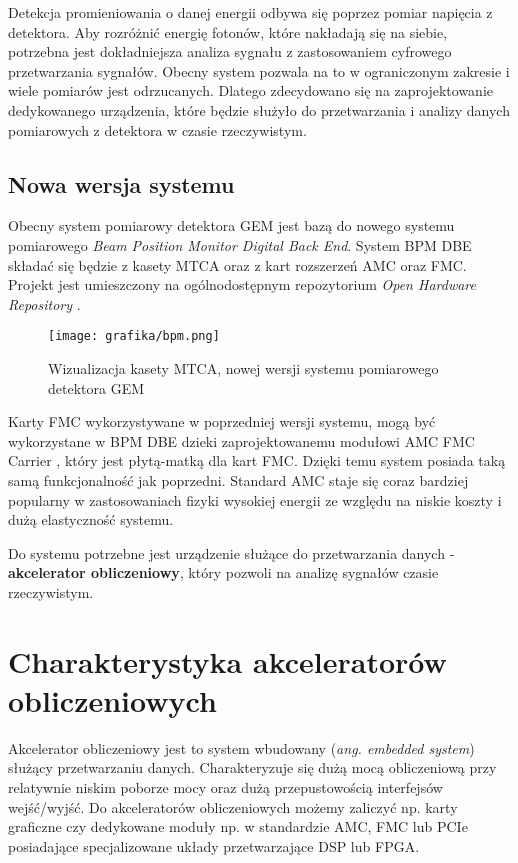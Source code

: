 Detekcja promieniowania o danej energii odbywa się poprzez pomiar napięcia z detektora. Aby rozróżnić energię fotonów, które nakładają się na siebie, potrzebna jest dokładniejsza analiza sygnału z zastosowaniem cyfrowego przetwarzania sygnałów. Obecny system pozwala na to w ograniczonym zakresie i wiele pomiarów jest odrzucanych. Dlatego zdecydowano się na zaprojektowanie dedykowanego urządzenia, które będzie służyło do przetwarzania i analizy danych pomiarowych z detektora w czasie rzeczywistym. 

\subsection{Nowa wersja systemu}
Obecny system pomiarowy detektora GEM jest bazą do nowego systemu pomiarowego \textit{Beam Position Monitor Digital Back End}. System BPM DBE składać się będzie z kasety MTCA oraz z kart rozszerzeń AMC oraz FMC. Projekt jest umieszczony na ogólnodostępnym repozytorium \textit{Open Hardware Repository} \cite{BPMDBM}. 


	\begin{figure}[!here]
	\begin{center}
	\texttt{[image: grafika/bpm.png]}
	\end{center}
	\caption{Wizualizacja kasety MTCA, nowej wersji systemu pomiarowego detektora GEM}
	\label{GEM_BPM}
	\end{figure} 
  
   
    
Karty FMC wykorzystywane w poprzedniej wersji systemu, mogą być wykorzystane w BPM DBE dzieki zaprojektowanemu modułowi AMC FMC Carrier \cite{AFC}, który jest płytą-matką dla kart FMC. Dzięki temu system posiada taką samą funkcjonalność jak poprzedni. Standard AMC staje się coraz bardziej popularny w zastosowaniach fizyki wysokiej energii \cite{MTCA_4} ze względu na niskie koszty i dużą elastyczność systemu. 

Do systemu potrzebne jest urządzenie służące do przetwarzania danych - \textbf{akcelerator obliczeniowy}, który pozwoli na analizę sygnałów czasie rzeczywistym. 

\section{Charakterystyka akceleratorów obliczeniowych}

Akcelerator obliczeniowy jest to system wbudowany (\textit{ang. embedded system}) służący przetwarzaniu danych. Charakteryzuje się dużą mocą obliczeniową przy relatywnie niskim poborze mocy oraz dużą przepustowością interfejsów wejść/wyjść. Do akceleratorów obliczeniowych możemy zaliczyć np. karty graficzne czy dedykowane moduły np. w standardzie AMC, FMC lub PCIe posiadające specjalizowane układy przetwarzające DSP lub FPGA. 

